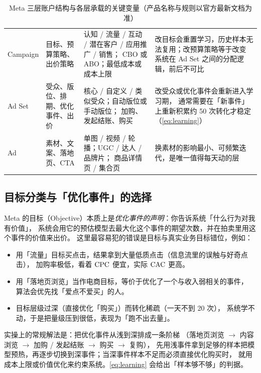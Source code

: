 \begin{table}[htbp]
\centering
\caption{Meta 三层账户结构与各层承载的关键变量（产品名称与规则以官方最新文档为准）}
\label{tab:meta-structure}
\small
\begin{tabularx}{\textwidth}{L{2.0cm} L{2.9cm} L{4.2cm} Y}
\toprule
{} &  &  &  \\
\midrule
Campaign & 目标、预算策略、出价策略 & 认知 / 流量 / 互动 / 潜在客户 / 应用推广 / 销售；
CBO 或 ABO；最低成本或成本上限 & 改目标会重置学习，历史样本无法复用；改预算策略等于改变
系统在 Ad Set 之间的分配逻辑，前后不可比 \\
Ad Set & 受众、版位、排期、优化事件、出价 & 核心 / 自定义 / 类似受众；自动版位或手动版位；
加购、发起结账、购买 & 改受众或优化事件会重新进入学习期，
通常需要在「新事件」上重新积累约 50 次转化才稳定（\cref{eq:learning}）\\
Ad & 素材、文案、落地页、CTA & 单图 / 视频 / 轮播；UGC / 达人 / 品牌片；
商品详情页 / 集合页 & 换素材的影响最小、可频繁迭代，是唯一值得每天动的层 \\
\bottomrule
\end{tabularx}
\end{table}

\subsection{目标分类与「优化事件」的选择}

Meta 的目标（Objective）本质上是\emph{优化事件的声明}：你告诉系统「什么行为对我有价值」，
系统会用它的预估模型去最大化这个事件的期望次数，并在拍卖里用这个事件的价值来出价。
这里最容易犯的错误是目标与真实业务目标错位，例如：

\begin{itemize}
  \item 用「流量」目标买点击，结果拿到大量低质点击（信息流里的误触与好奇点击），
        加购率极低，看着 $\operatorname{CPC}$ 便宜，实际 $\operatorname{CAC}$ 更高。
  \item 用「落地页浏览」当作电商目标，等价于优化了一个与收入弱相关的事件，
        算法会优先找「爱点不爱买」的人。
  \item 目标层级过深（直接优化「购买」）而转化稀疏（一天不到 20 次），
        系统学不动，于是把量级压到很低，表现为「跑不出去量」。
\end{itemize}

实操上的常规解法是：把优化事件从浅到深排成一条阶梯
（落地页浏览 $\to$ 内容浏览 $\to$ 加购 / 发起结账 $\to$ 购买 $\to$ 复购），
先用浅事件拿到足够的样本把模型预热，再逐步切换到深事件；当深事件样本不足而必须直接优化购买时，
就用成本上限或价值优化来约束系统。\cref{eq:learning} 会给出「样本够不够」的判据。

